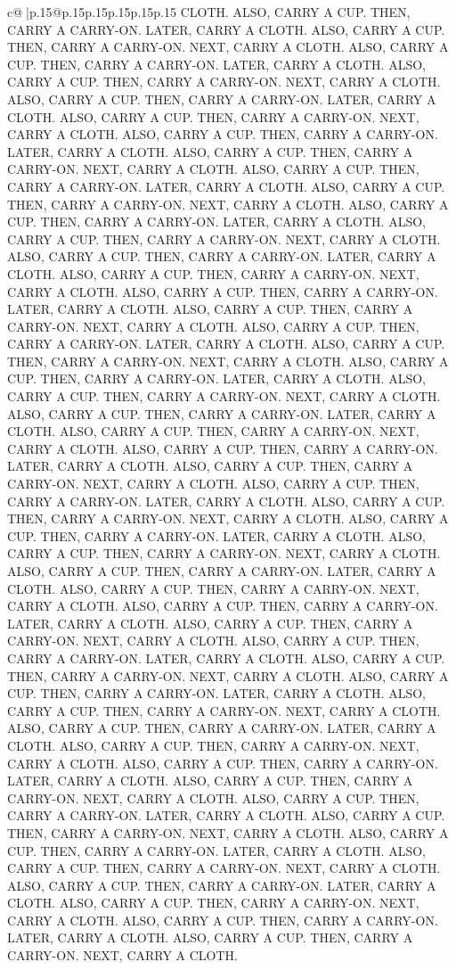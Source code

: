 \documentclass{article}
\begin{document}
{\begin{supertabular}{c@{$\;$}|p{.15\linewidth}@{}p{.15\linewidth}p{.15\linewidth}p{.15\linewidth}p{.15\linewidth}p{.15\linewidth}}
{{{CLOTH. ALSO, CARRY A CUP. THEN, CARRY A CARRY{-}ON. LATER, CARRY A CLOTH. ALSO, CARRY A CUP. THEN, CARRY A CARRY{-}ON. NEXT, CARRY A CLOTH. ALSO, CARRY A CUP. THEN, CARRY A CARRY{-}ON. LATER, CARRY A CLOTH. ALSO, CARRY A CUP. THEN, CARRY A CARRY{-}ON. NEXT, CARRY A CLOTH. ALSO, CARRY A CUP. THEN, CARRY A CARRY{-}ON. LATER, CARRY A CLOTH. ALSO, CARRY A CUP. THEN, CARRY A CARRY{-}ON. NEXT, CARRY A CLOTH. ALSO, CARRY A CUP. THEN, CARRY A CARRY{-}ON. LATER, CARRY A CLOTH. ALSO, CARRY A CUP. THEN, CARRY A CARRY{-}ON. NEXT, CARRY A CLOTH. ALSO, CARRY A CUP. THEN, CARRY A CARRY{-}ON. LATER, CARRY A CLOTH. ALSO, CARRY A CUP. THEN, CARRY A CARRY{-}ON. NEXT, CARRY A CLOTH. ALSO, CARRY A CUP. THEN, CARRY A CARRY{-}ON. LATER, CARRY A CLOTH. ALSO, CARRY A CUP. THEN, CARRY A CARRY{-}ON. NEXT, CARRY A CLOTH. ALSO, CARRY A CUP. THEN, CARRY A CARRY{-}ON. LATER, CARRY A CLOTH. ALSO, CARRY A CUP. THEN, CARRY A CARRY{-}ON. NEXT, CARRY A CLOTH. ALSO, CARRY A CUP. THEN, CARRY A CARRY{-}ON. LATER, CARRY A CLOTH. ALSO, CARRY A CUP. THEN, CARRY A CARRY{-}ON. NEXT, CARRY A CLOTH. ALSO, CARRY A CUP. THEN, CARRY A CARRY{-}ON. LATER, CARRY A CLOTH. ALSO, CARRY A CUP. THEN, CARRY A CARRY{-}ON. NEXT, CARRY A CLOTH. ALSO, CARRY A CUP. THEN, CARRY A CARRY{-}ON. LATER, CARRY A CLOTH. ALSO, CARRY A CUP. THEN, CARRY A CARRY{-}ON. NEXT, CARRY A CLOTH. ALSO, CARRY A CUP. THEN, CARRY A CARRY{-}ON. LATER, CARRY A CLOTH. ALSO, CARRY A CUP. THEN, CARRY A CARRY{-}ON. NEXT, CARRY A CLOTH. ALSO, CARRY A CUP. THEN, CARRY A CARRY{-}ON. LATER, CARRY A CLOTH. ALSO, CARRY A CUP. THEN, CARRY A CARRY{-}ON. NEXT, CARRY A CLOTH. ALSO, CARRY A CUP. THEN, CARRY A CARRY{-}ON. LATER, CARRY A CLOTH. ALSO, CARRY A CUP. THEN, CARRY A CARRY{-}ON. NEXT, CARRY A CLOTH. ALSO, CARRY A CUP. THEN, CARRY A CARRY{-}ON. LATER, CARRY A CLOTH. ALSO, CARRY A CUP. THEN, CARRY A CARRY{-}ON. NEXT, CARRY A CLOTH. ALSO, CARRY A CUP. THEN, CARRY A CARRY{-}ON. LATER, CARRY A CLOTH. ALSO, CARRY A CUP. THEN, CARRY A CARRY{-}ON. NEXT, CARRY A CLOTH. ALSO, CARRY A CUP. THEN, CARRY A CARRY{-}ON. LATER, CARRY A CLOTH. ALSO, CARRY A CUP. THEN, CARRY A CARRY{-}ON. NEXT, CARRY A CLOTH. ALSO, CARRY A CUP. THEN, CARRY A CARRY{-}ON. LATER, CARRY A CLOTH. ALSO, CARRY A CUP. THEN, CARRY A CARRY{-}ON. NEXT, CARRY A CLOTH. ALSO, CARRY A CUP. THEN, CARRY A CARRY{-}ON. LATER, CARRY A CLOTH. ALSO, CARRY A CUP. THEN, CARRY A CARRY{-}ON. NEXT, CARRY A CLOTH. ALSO, CARRY A CUP. THEN, CARRY A CARRY{-}ON. LATER, CARRY A CLOTH. ALSO, CARRY A CUP. THEN, CARRY A CARRY{-}ON. NEXT, CARRY A CLOTH. ALSO, CARRY A CUP. THEN, CARRY A CARRY{-}ON. LATER, CARRY A CLOTH. ALSO, CARRY A CUP. THEN, CARRY A CARRY{-}ON. NEXT, CARRY A CLOTH. ALSO, CARRY A CUP. THEN, CARRY A CARRY{-}ON. LATER, CARRY A CLOTH. ALSO, CARRY A CUP. THEN, CARRY A CARRY{-}ON. NEXT, CARRY A CLOTH. ALSO, CARRY A CUP. THEN, CARRY A CARRY{-}ON. LATER, CARRY A CLOTH. ALSO, CARRY A CUP. THEN, CARRY A CARRY{-}ON. NEXT, CARRY A CLOTH. ALSO, CARRY A CUP. THEN, CARRY A CARRY{-}ON. LATER, CARRY A CLOTH. ALSO, CARRY A CUP. THEN, CARRY A CARRY{-}ON. NEXT, CARRY A CLOTH. ALSO, CARRY A CUP. THEN, CARRY A CARRY{-}ON. LATER, CARRY A CLOTH. ALSO, CARRY A CUP. THEN, CARRY A CARRY{-}ON. NEXT, CARRY A CLOTH. }}}
\end{supertabular}}
\end{document}
